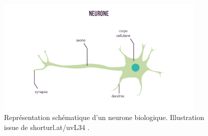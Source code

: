 \begin{figure}
  \centering
  \includegraphics[width=10cm]{./Chapitre2/figures/neuroneBio.png}
  \caption{Représentation schématique d'un neurone biologique. Illustration issue de shorturl.at/uvL34 .}
  \label{fig:neuroneBio}
\end{figure}
